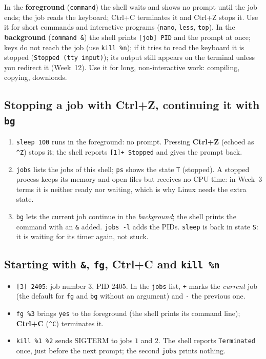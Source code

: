 \documentclass[11pt,a4paper]{article}
\newcommand{\cmd}[1]{\texttt{#1}}
\begin{document}
In the \textbf{foreground} (\texttt{command}) the shell waits and shows no prompt until the job ends; the job reads the keyboard; Ctrl+C terminates it and Ctrl+Z stops it. Use it for short commands and interactive programs (\cmd{nano}, \cmd{less}, \cmd{top}). In the \textbf{background} (\texttt{command \&}) the shell prints \texttt{[job] PID} and the prompt at once; keys do not reach the job (use \cmd{kill \%n}); if it tries to read the keyboard it is stopped (\texttt{Stopped (tty input)}); its output still appears on the terminal unless you redirect it (Week~12). Use it for long, non-interactive work: compiling, copying, downloads.

\subsection{Stopping a job with Ctrl+Z, continuing it with \texttt{bg}}



\begin{enumerate}[leftmargin=1.4em]
  \item \cmd{sleep 100} runs in the foreground: no prompt. Pressing \textbf{Ctrl+Z} (echoed as \texttt{\^{}Z}) stops it; the shell reports \texttt{[1]+ Stopped} and gives the prompt back.
  \item \cmd{jobs} lists the jobs of this shell; \cmd{ps} shows the state \texttt{T} (stopped). A stopped process keeps its memory and open files but receives no CPU time: in Week~3 terms it is neither ready nor waiting, which is why Linux needs the extra state.
  \item \cmd{bg} lets the current job continue in the \emph{background}; the shell prints the command with an \texttt{\&} added. \cmd{jobs -l} adds the PIDs. \cmd{sleep} is back in state \texttt{S}: it is waiting for its timer again, not stuck.
\end{enumerate}

\subsection{Starting with \texttt{\&}, \texttt{fg}, Ctrl+C and \texttt{kill \%n}}



\begin{itemize}
  \item \texttt{[3] 2405}: job number $3$, PID $2405$. In the \cmd{jobs} list, \texttt{+} marks the \emph{current} job (the default for \cmd{fg} and \cmd{bg} without an argument) and \texttt{-} the previous one.
  \item \cmd{fg \%3} brings \cmd{yes} to the foreground (the shell prints its command line); \textbf{Ctrl+C} (\texttt{\^{}C}) terminates it.
  \item \cmd{kill \%1 \%2} sends SIGTERM to jobs $1$ and $2$. The shell reports \texttt{Terminated} once, just before the next prompt; the second \cmd{jobs} prints nothing.
\end{itemize}
\end{document}
